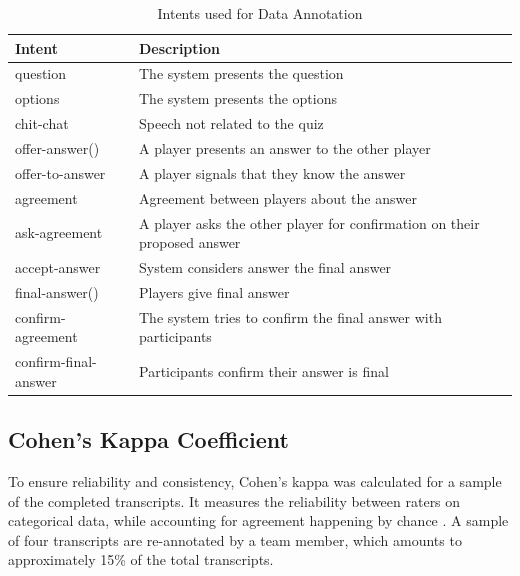 \documentclass[hidelinks, 11pt]{article}
\begin{document}
\noindent
\begin{table}[h!]
  \begin{tabular}{ | p{2cm} | p{5cm} | }
    \hline
    \rowcolor[HTML]{CCDFF1}
    \textbf{Intent}      & \textbf{Description}                                                     \\
    \hline
    question             & The system presents the question                                         \\
    \hline
    options              & The system presents the options                                          \\
    \hline
    chit-chat            & Speech not related to the quiz                                           \\
    \hline
    offer-answer()       & A player presents an answer to the other player                          \\
    \hline
    offer-to-answer      & A  player signals that they know the answer                              \\
    \hline
    agreement            & Agreement between players about the answer                               \\
    \hline
    ask-agreement        & A player asks the other player for confirmation on their proposed answer \\
    \hline
    accept-answer        & System considers answer the final answer                                 \\
    \hline
    final-answer()       & Players give final answer                                                \\
    \hline
    confirm-agreement    & The system tries to confirm the final answer with participants           \\
    \hline
    confirm-final-answer & Participants confirm their answer is final                               \\
    \hline
  \end{tabular}
  \caption{Intents used for Data Annotation}
  \label{table:intents}
\end{table}

\subsection{Cohen's Kappa Coefficient}
To ensure reliability and consistency, Cohen's kappa was calculated for a sample of the completed transcripts. It measures the reliability between raters on categorical data, while accounting for agreement happening by chance \cite{Cohen_1960}. A sample of four transcripts are re-annotated by a team member, which amounts to approximately 15\% of the total transcripts.
\end{document}
